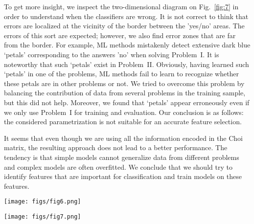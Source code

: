 \documentclass[%
 aip,
 floatfix,
 amsmath,amssymb,
 reprint,%
]{revtex4-1}
\begin{document}
To get more insight, we inspect the two-dimensional diagram on Fig.~\ref{fig:7} in order to understand when the classifiers are wrong. It is not correct to think that errors are localized at the vicinity of the border between the 'yes/no' areas. The errors of this sort are expected; however, we also find  error zones that are far from the border. For example, ML methods mistakenly detect extensive dark blue ‘petals’ corresponding to the answers 'no' when solving Problem~I. It is noteworthy that such ‘petals’ exist in Problem~II. Obviously, having learned such ‘petals’ in one of the problems, ML methods fail to learn to recognize whether these petals are in other problems or not. We tried to overcome this problem by balancing the contribution of data from several problems in the training sample, but this did not help. Moreover, we found that ‘petals’ appear erroneously even if we only use Problem~I for training and evaluation. Our conclusion is as follows: the considered parametrization is not suitable for an accurate feature selection. 

It seems that even though we are using all the information encoded  in the Choi matrix, the resulting approach does not lead to a better performance. The tendency is that simple models cannot generalize data from different problems and complex models are often overfitted. We conclude that we should try to identify features that are important for classification and train models on these features.

\begin{figure*}[t]
\texttt{[image: figs/fig6.png]}
\caption{Classification accuracy for datasets of the Choi eigenvalues, and their functions, square roots and fourth-order roots (green) compared to the accuracy obtained by employing datasets generated by using elements of the Choi matrices (light blue). Samples from Problem~I and Problem~II were used for training and testing. The accuracy is quantified by using three different measures (see Section VA). The center of a diagram corresponds to accuracy $0.4$.} \label{fig:6}
\end{figure*}

\begin{figure*}[h]
  \texttt{[image: figs/fig7.png]}
  \caption{'Yes/no' partition of 
  the parameter space for Problems I (top row) and II (bottom row) for different values of phase shift. Partitions are obtained by using the test, Eq.~(13)[left] and ML methods,  the Nearest neighbors method [center] and the Random forest method [right]. For the ML methods the parametrization based on the elements of Choi matrices is used.} \label{fig:7}
\end{figure*}
\end{document}
